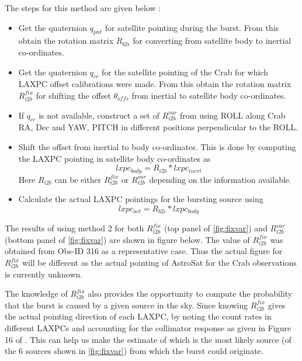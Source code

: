 \documentclass[11pt,a4paper,eulermath,pdfspacing]{article} %
\begin{document}
\begin{enumerate}
		The steps for this method are given below :
		\begin{itemize}
			\item Get the quaternion $q_{pnt}$ for satellite pointing during the
				burst. From this obtain the rotation matrix $R_{b2i}$ for converting from
				satellite body to inertial co-ordinates.
			\item Get the quaternion $q_{cr}$ for the satellite pointing of the Crab for
				which LAXPC offset calibrations were made. From this obtain the
				rotation matrix $R^{fix}_{i2b}$ for shifting the offset
				$\theta_{offs}$ from inertial to satellite body co-ordinates.
			\item If $q_{cr}$ is not available, construct a set of
				$R^{var}_{i2b}$ from using ROLL along Crab RA, Dec and YAW,
				PITCH in different positions perpendicular to the ROLL.
			\item Shift the offset from inertial to body co-ordinates. This is
				done by computing the LAXPC pointing in satellite body
				co-ordinates as 
				\begin{equation}
					lxpc_{body} = R_{i2b} * lxpc_{inert}
					\label{eqn:i2b}
				\end{equation}
				Here $R_{i2b}$ can be either $R^{fix}_{i2b}$ or $R^{var}_{i2b}$
				depending on the information available.
			\item Calculate the actual LAXPC pointings for the bursting source
				using 
				\begin{equation}
					lxpc_{act} = R_{b2i} * lxpc_{body}
					\label{eqn:b2i}
				\end{equation}
		\end{itemize}

\end{enumerate}


The results of using method 2 for both $R^{fix}_{i2b}$ (top panel of
\autoref{fig:fixvar}) and $R^{var}_{i2b}$ (bottom panel of \autoref{fig:fixvar})
are shown in figure below. The value of
$R^{fix}_{i2b}$ was obtained from Obs-ID 316 as a representative case. Thus
the actual figure for $R^{fix}_{i2b}$ will be different as the actual pointing of AstroSat for the Crab
observations is currently unknown.

The knowledge of $R^{fix}_{i2b}$ also provides the opportunity to compute the
probability that the burst is caused by a given source in the sky. Since knowing
$R^{fix}_{i2b}$ gives the actual pointing direction of each LAXPC, by noting the
count rates in different LAXPCs and accounting for the collimator response as
given in Figure 16 of \citet{anti:2017}. This can help us make the estimate of
which is the most likely source (of the 6 sources shown in \autoref{fig:fixvar})
from which the burst could originate.

{}

\end{document}
